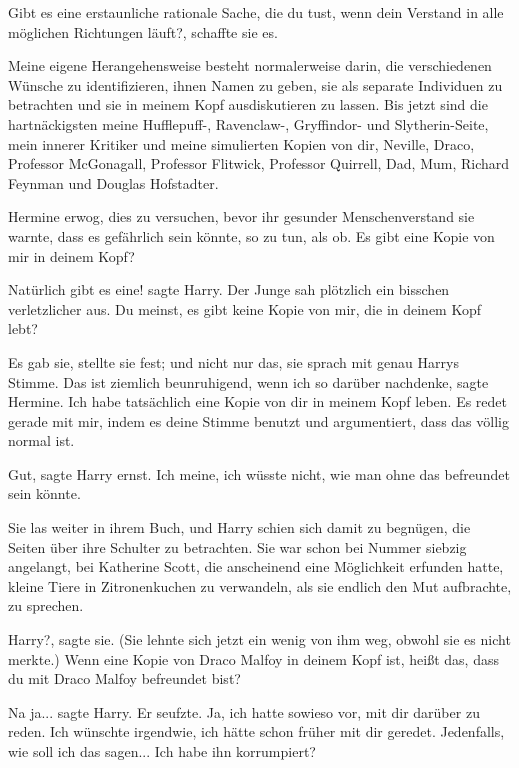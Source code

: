 \glqq{}Gibt es eine erstaunliche rationale Sache, die du tust, wenn dein Verstand
in alle möglichen Richtungen läuft?\grqq{}, schaffte sie es.

\glqq{}Meine eigene Herangehensweise besteht normalerweise darin, die
verschiedenen Wünsche zu identifizieren, ihnen Namen zu geben, sie als separate
Individuen zu betrachten und sie in meinem Kopf ausdiskutieren zu lassen. Bis
jetzt sind die hartnäckigsten meine Hufflepuff-, Ravenclaw-, Gryffindor- und
Slytherin-Seite, mein innerer Kritiker und meine simulierten Kopien von dir,
Neville, Draco, Professor McGonagall, Professor Flitwick, Professor Quirrell,
Dad, Mum, Richard Feynman und Douglas Hofstadter.\grqq{}

Hermine erwog, dies zu versuchen, bevor ihr gesunder Menschenverstand sie
warnte, dass es gefährlich sein könnte, so zu tun, als ob. \glqq{}Es gibt eine
Kopie von mir in deinem Kopf?\grqq{}

\glqq{}Natürlich gibt es eine!\grqq{} sagte Harry. Der Junge sah plötzlich ein
bisschen verletzlicher aus. \glqq{}Du meinst, es gibt keine Kopie von mir, die in
deinem Kopf lebt?\grqq{}

Es gab sie, stellte sie fest; und nicht nur das, sie sprach mit genau Harrys
Stimme. \glqq{}Das ist ziemlich beunruhigend, wenn ich so darüber
nachdenke\grqq{}, sagte Hermine. \glqq{}Ich habe tatsächlich eine Kopie von dir
in meinem Kopf leben. Es redet gerade mit mir, indem es deine Stimme benutzt und
argumentiert, dass das völlig normal ist.\grqq{}

\glqq{}Gut\grqq{}, sagte Harry ernst. \glqq{}Ich meine, ich wüsste nicht, wie man
ohne das befreundet sein könnte.\grqq{}

Sie las weiter in ihrem Buch, und Harry schien sich damit zu begnügen, die
Seiten über ihre Schulter zu betrachten. Sie war schon bei Nummer siebzig
angelangt, bei Katherine Scott, die anscheinend eine Möglichkeit erfunden hatte,
kleine Tiere in Zitronenkuchen zu verwandeln, als sie endlich den Mut
aufbrachte, zu sprechen.

\glqq{}Harry?\grqq{}, sagte sie. (Sie lehnte sich jetzt ein wenig von ihm weg,
obwohl sie es nicht merkte.) \glqq{}Wenn eine Kopie von Draco Malfoy in deinem
Kopf ist, heißt das, dass du mit Draco Malfoy befreundet bist?\grqq{}

\glqq{}Na ja...\grqq{} sagte Harry. Er seufzte. \glqq{}Ja, ich hatte sowieso vor,
mit dir darüber zu reden. Ich wünschte irgendwie, ich hätte schon früher mit dir
geredet. Jedenfalls, wie soll ich das sagen... Ich habe ihn korrumpiert?\grqq{}

